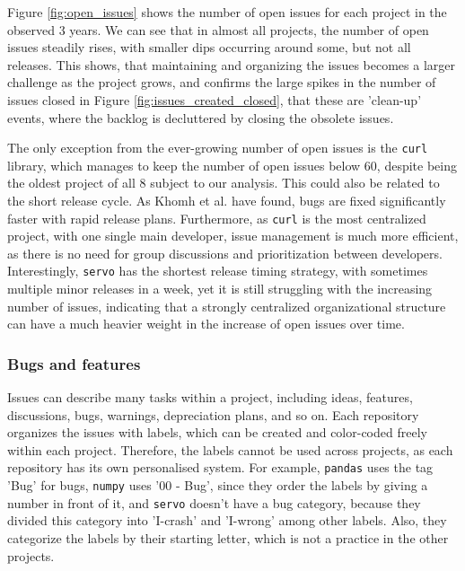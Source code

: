 Figure \ref{fig:open_issues} shows the number of open issues for each project in the observed 3 years. We can see that in almost all projects, the number of open issues steadily rises, with smaller dips occurring around some, but not all releases. This shows, that maintaining and organizing the issues becomes a larger challenge as the project grows, and confirms the large spikes in the number of issues closed in Figure \ref{fig:issues_created_closed}, that these are 'clean-up' events, where the backlog is decluttered by closing the obsolete issues.

The only exception from the ever-growing number of open issues is the \texttt{curl} library, which manages to keep the number of open issues below 60, despite being the oldest project of all 8 subject to our analysis. This could also be related to the short release cycle. As Khomh et al. \cite{khomhFasterReleasesImprove2012} have found, bugs are fixed significantly faster with rapid release plans. Furthermore, as \texttt{curl} is the most centralized project, with one single main developer, issue management is much more efficient, as there is no need for group discussions and prioritization between developers. Interestingly, \texttt{servo} has the shortest release timing strategy, with sometimes multiple minor releases in a week, yet it is still struggling with the increasing number of issues, indicating that a strongly centralized organizational structure can have a much heavier weight in the increase of open issues over time.

\subsubsection{Bugs and features}

Issues can describe many tasks within a project, including ideas, features, discussions, bugs, warnings, depreciation plans, and so on. Each repository organizes the issues with labels, which can be created and color-coded freely within each project. Therefore, the labels cannot be used across projects, as each repository has its own personalised system. For example, \texttt{pandas} uses the tag 'Bug' for bugs, \texttt{numpy} uses '00 - Bug', since they order the labels by giving a number in front of it, and \texttt{servo} doesn't have a bug category, because they divided this category into 'I-crash' and 'I-wrong' among other labels. Also, they categorize the labels by their starting letter, which is not a practice in the other projects.


